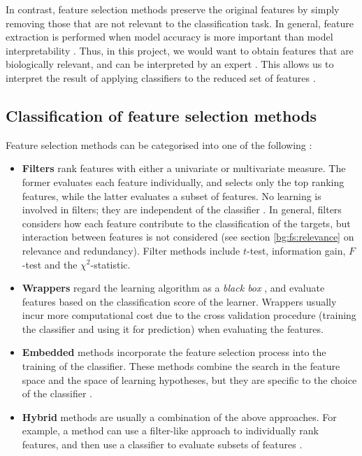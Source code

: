 \documentclass[12pt, twoside, a4paper]{report}
\begin{document}
In contrast, feature selection methods preserve the original features by simply removing those that are not relevant to the classification task. In general, feature extraction is performed when model accuracy is more important than model interpretability \cite{RefWorks:163}. Thus, in this project, we would want to obtain features that are biologically relevant, and can be interpreted by an expert \cite{RefWorks:192}. This allows us to interpret the result of applying classifiers to the reduced set of features \cite{RefWorks:142}.

\subsection{Classification of feature selection methods} \label{bg:fs:classification}

Feature selection methods can be categorised into one of the following \cite{RefWorks:117, RefWorks:118}:

\begin{itemize}
\item \textbf{Filters} rank features with either a univariate or multivariate measure. The former evaluates each feature individually, and selects only the top ranking features, while the latter evaluates a subset of features. No learning is involved in filters; they are independent of the classifier \cite{RefWorks:216}. In general, filters considers how each feature contribute to the classification of the targets, but interaction between features is not considered \cite{RefWorks:232} (see section \ref{bg:fs:relevance} on relevance and redundancy). Filter methods include $t$-test, information gain, $F$-test and the $\chi^2$-statistic.

\item \textbf{Wrappers} regard the learning algorithm as a \textit{black box} \cite{RefWorks:140}, and evaluate features based on the classification score of the learner. Wrappers usually incur more computational cost due to the cross validation procedure (training the classifier and using it for prediction) when evaluating the features.

\item \textbf{Embedded} methods incorporate the feature selection process into the training of the classifier. These methods combine the search in the feature space and the space of learning hypotheses, but they are specific to the choice of the classifier \cite{RefWorks:118}.

\item \textbf{Hybrid} methods are usually a combination of the above approaches. For example, a method can use a filter-like approach to individually rank features, and then use a classifier to evaluate subsets of features \cite{RefWorks:140}.

\end{itemize}
\end{document}
